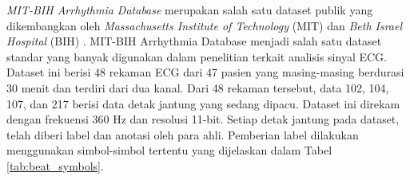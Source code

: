 \textit{MIT-BIH Arrhythmia Database} merupakan salah satu dataset publik yang dikembangkan oleh \textit{Massachusetts Institute of Technology} (MIT) dan \textit{Beth Israel Hospital} (BIH) \parencite{moodyImpactMITBIHArrhythmia2001}.
MIT-BIH Arrhythmia Database menjadi salah satu dataset standar yang banyak digunakan dalam penelitian terkait analisis sinyal ECG.
Dataset ini berisi 48 rekaman ECG dari 47 pasien yang masing-masing berdurasi 30 menit dan terdiri dari dua kanal.
Dari 48 rekaman tersebut, data 102, 104, 107, dan 217 berisi data detak jantung yang sedang dipacu.
Dataset ini direkam dengan frekuensi 360 Hz dan resolusi 11-bit.
Setiap detak jantung pada dataset, telah diberi label dan anotasi oleh para ahli.
Pemberian label dilakukan menggunakan simbol-simbol tertentu yang dijelaskan dalam Tabel \ref{tab:beat_symbols}.



